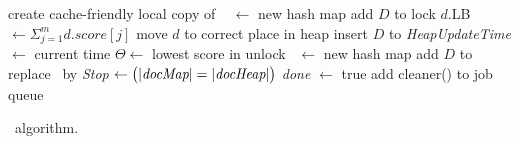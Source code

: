 \begin{algorithm*}[htb]
\begin{multicols}{2}
\begin{algorithmic}[1]
        			\State \Comment create cache-friendly local copy of \DMap\ %
        			\State \TMap[i] $\leftarrow$ new hash map
            			\State add $D$ to \TMap[i] \label{l:hash-chash}
            		\EndFor
\EndProcedure
\Statex 
{} 
\State lock \DHeap \label{l:lock-heap}
	  \label{l:for-all-heap-docs}
		\State $d$.LB $\leftarrow \Sigma_{j=1}^{m} d.score[j]$
		\State move $d$ to correct place in heap \label{l:fix-heap}
	\EndFor
\State insert $D$ to \DHeap 
\State \emph{HeapUpdateTime} $\leftarrow$ current time 
\State  $\Theta \leftarrow$ lowest score in \DHeap
\EndIf
\State unlock \DHeap  \label{l:unlock-heap}
\EndProcedure
%
%
\Statex 
{} \label{l:clean-start}
\If{$|\DMap | > \Phi $} 
\State \LDMap\ $\leftarrow$ new hash map \label{l:clean-local-copy}
{} 
	\State add   $D$ to \LDMap
\EndIf
\EndFor
\State replace \DMap\ by \LDMap \label{l:clean-replace}
\EndIf
\Statex
\State \emph{Stop} $\leftarrow \big( |\textit{docMap}| = |\textit{docHeap}| \big)$ \label{l:clean-stop-cond}
\State \emph{done} $\leftarrow$ true
\Else 
\State add {\sc cleaner()} to job queue
\EndIf
\label{l:clean-end}
\EndProcedure 
\end{algorithmic}
\end{multicols}
\caption{\alg\ algorithm.}
\label{alg:sparta}
\end{algorithm*}